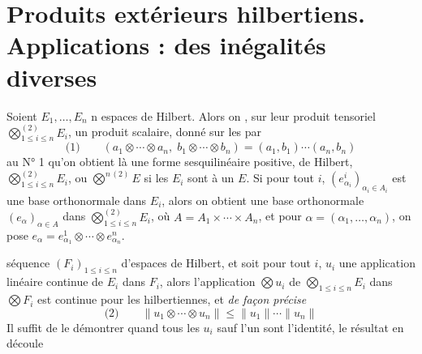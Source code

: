 \documentclass[11pt,a4paper]{article}
\begin{document}
\section{Produits extérieurs hilbertiens. Applications : des inégalités diverses}


Soient $E_1, \ldots, E_n$ n espaces de Hilbert. Alors on ,  sur leur produit tensoriel $\bigotimes^{(2)}_{1 \leq i \leq n} E_i$,  un produit scalaire, donné sur les   par 
\[
  \text{(1)}\qquad (a_1 \otimes \cdots \otimes a_n,\; b_1 \otimes \cdots \otimes b_n) = (a_1, b_1) \cdots (a_n, b_n)
\]
   au N° 1 qu'on obtient là une forme sesquilinéaire    positive, \struck{\ill{}}  \ill{}   \ill{} de Hilbert,  \ill{}  $\bigotimes^{(2)}_{1 \leq i \leq n} E_i$, ou $\bigotimes^{n\,(2)} E$ si  les $E_i$ sont  à un   $E$. Si pour tout $i$, $(e^{i}_{\alpha_i})_{\alpha_i \in A_i}$ est une base orthonormale dans $E_i$, alors on obtient une base orthonormale $(e_\alpha)_{\alpha \in A}$ dans $\bigotimes^{(2)}_{1 \leq i \leq n} E_i$, où $A = A_1 \times \cdots \times A_n$, et pour $\alpha = (\alpha_1, \ldots, \alpha_n)$, on pose $e_\alpha = e^{1}_{\alpha_1} \otimes \cdots \otimes e^{n}_{\alpha_n}$.

  \struck{\ill{}}  séquence $(F_i)_{1 \leq i \leq n}$ d'espaces de Hilbert, et soit pour tout $i$, $u_i$ une application linéaire continue de $E_i$ dans $F_i$, alors l'application $\bigotimes u_i$ de $\bigotimes_{1 \leq i \leq n} E_i$ dans $\bigotimes F_i$ est continue pour les  hilbertiennes, et \emph{de façon précise}
\[
  \text{(2)}\qquad \|u_1 \otimes \cdots \otimes u_n\| \leq \|u_1\| \cdots \|u_n\|
\]
Il suffit  de le démontrer quand tous les $u_i$ sauf l'un sont l'identité,  le résultat en découle \ill{}
\end{document}
